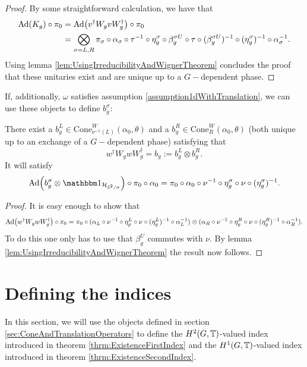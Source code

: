 \documentclass[11pt,a4paper,twoside]{article}
\numberwithin{equation}{section}
\begin{document}
	\begin{proof}
		By some straightforward calculation, we have that
		\begin{align}
			\Ad{K_g}\circ\pi_0&=\Ad{v^\dagger W_g v W_g^\dagger}\circ\pi_0\\
			\nonumber
			&=\bigotimes_{\sigma=L,R}\pi_\sigma\circ\alpha_\sigma\circ\tau^{-1}\circ \eta_g^\sigma\circ\beta_g^{\sigma U}\circ\tau\circ(\beta_g^{\sigma U})^{-1}\circ(\eta_g^{\sigma})^{-1}\circ\alpha_\sigma^{-1}.
		\end{align}
		Using lemma \ref{lem:UsingIrreducibilityAndWignerTheorem} concludes the proof that these unitaries exist and are unique up to a $G-$dependent phase.
	\end{proof}
	If, additionally, $\omega$ satisfies assumption \ref{assumption1dWithTranslation}, we can use these objects to define $b^\sigma_g$:
	\begin{lemma}
		There exist a $b_g^L\in\textrm{Cone}_{\nu^{-1}(L)}^W(\alpha_0,\theta)$ and a $b_g^R\in\textrm{Cone}_{R}^W(\alpha_0,\theta)$ (both unique up to an exchange of a $G-$dependent phase) satisfying that
		\begin{equation}
			w^\dagger W_g w W_g^\dagger=b_g:=b_g^L\otimes b_g^R.
		\end{equation}
		It will satisfy
		\begin{equation}\label{eq:automorphismBelongingTo_b}
			\Ad{b_g^\sigma\otimes\id_{\HH_{\ZZ^2/\sigma}}}\circ\pi_0\circ\alpha_0=\pi_0\circ\alpha_0\circ\nu^{-1}\circ\eta_g^\sigma\circ\nu\circ(\eta_g^\sigma)^{-1}.
		\end{equation}
	\end{lemma}
	\begin{proof}
		It is easy enough to show that
		\begin{equation}
			\Ad{w^\dagger W_g w W_g^\dagger}\circ\pi_0=\pi_0\circ (\alpha_L\circ\nu^{-1}\circ\eta_g^L\circ\nu\circ(\eta_g^L)^{-1}\circ\alpha_L^{-1})\otimes(\alpha_R\circ\nu^{-1}\circ\eta_g^R\circ\nu\circ(\eta_g^R)^{-1}\circ\alpha_R^{-1}).
		\end{equation}
		To do this one only has to use that $\beta_g^U$ commutes with $\nu$. By lemma \ref{lem:UsingIrreducibilityAndWignerTheorem} the result now follows.
	\end{proof}
	\section{Defining the indices}
	In this section, we will use the objects defined in section \ref{sec:ConeAndTranslationOperators} to define the $H^2(G,\mathbb T)$-valued index introduced in theorem \ref{thrm:ExistenceFirstIndex} and the $H^1(G,\mathbb T)$-valued index introduced in theorem \ref{thrm:ExistenceSecondIndex}.
\end{document}

